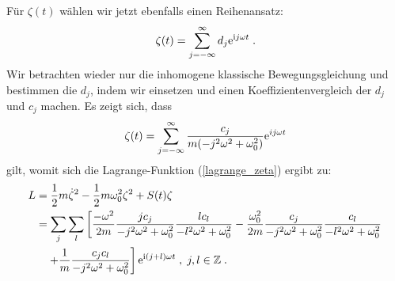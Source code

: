   Für $\zeta(t)$ wählen wir jetzt ebenfalls einen Reihenansatz:
  \begin{equation}
    \zeta(t) = \sum_{j=-\infty}^\infty d_j \text e^{\text ij\omega t} \; .
  \end{equation}
  Wir betrachten wieder nur die inhomogene klassische Bewegungsgleichung und bestimmen die $d_j$, indem wir einsetzen und einen Koeffizientenvergleich der $d_j$ und $c_j$ machen.
  Es zeigt sich, dass
  \begin{equation}
    \zeta(t) = \sum_{j=-\infty}^\infty \frac{c_j}{m(-j^2\omega^2+\omega_0^2)} \text e^{ij\omega t}
  \end{equation}
  gilt, womit sich die Lagrange-Funktion (\ref{lagrange_zeta}) ergibt zu:
  \begin{align}
    \begin{split}
      L &= \frac{1}{2}m\dot \zeta^2 - \frac{1}{2}m\omega_0^2\zeta^2 + S(t)\zeta \notag\\
       &=\sum_j \sum_l \left[ \frac{-\omega^2}{2m} \frac{jc_j}{-j^2\omega^2+\omega_0^2} \frac{lc_l}{-l^2\omega^2+\omega_0^2}
       -\frac{\omega_0^2}{2m} \frac{c_j}{-j^2\omega^2+\omega_0^2} \frac{c_l}{-l^2\omega^2+\omega_0^2} \right. \notag\\
        &\left. \quad + \frac{1}{m} \frac{c_jc_l}{-j^2\omega^2+\omega_0^2} \right] \text e^{\text i(j+l)\omega t}  \; , \; j,l \in \mathbb{Z} \; .
     \end{split}
   \end{align}
  \iffalse
  \begin{align}
    \begin{split}
      L &= \frac{1}{2}m\dot \zeta^2 - \frac{1}{2}m\omega_0^2\zeta^2 + S(t)\zeta \\
       &=\frac{-\omega^2}{2m} \sum_j \sum_l \frac{jc_j}{-j^2\omega^2+\omega_0^2} \frac{lc_l}{-l^2\omega^2+\omega_0^2} \text e^{\text i(j+l)\omega t}\\
       &\quad-\frac{\omega_0^2}{2m} \sum_j \sum_l \frac{c_j}{-j^2\omega^2+\omega_0^2} \frac{c_l}{-l^2\omega^2+\omega_0^2} \text e^{\text i(j+l)\omega t}\\
       &\quad + \frac{1}{m} \sum_j \sum_l \frac{c_jc_l}{-j^2\omega^2+\omega_0^2} \text e^{\text i(j+l)\omega t}\; , \; j,l \in \mathbb{Z} \; .
     \end{split}
   \end{align}
   \fi

